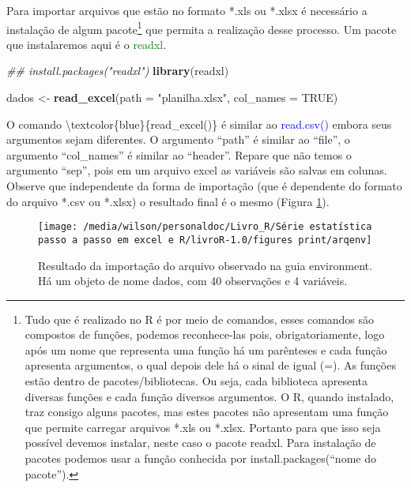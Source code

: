 \documentclass[14pt,titlepage, oneside, openany, a4paper]{book}
\newenvironment{Shaded}{\begin{snugshade}}{\end{snugshade}}
\newcommand{\CommentTok}[1]{\textcolor[rgb]{0.56,0.35,0.01}{\textit{#1}}}
\newcommand{\DataTypeTok}[1]{\textcolor[rgb]{0.13,0.29,0.53}{#1}}
\newcommand{\KeywordTok}[1]{\textcolor[rgb]{0.13,0.29,0.53}{\textbf{#1}}}
\newcommand{\NormalTok}[1]{#1}
\newcommand{\OtherTok}[1]{\textcolor[rgb]{0.56,0.35,0.01}{#1}}
\newcommand{\StringTok}[1]{\textcolor[rgb]{0.31,0.60,0.02}{#1}}
\begin{document}
Para importar arquivos que estão no formato *.xls ou *.xlsx é necessário a instalação de algum pacote\footnote{Tudo que é realizado no R é por meio de comandos, esses comandos são compostos de funções, podemos reconhece-las pois, obrigatoriamente, logo após um nome que representa uma função há um parênteses e cada função apresenta argumentos, o qual depois dele há o sinal de igual (=). As funções estão dentro de pacotes/bibliotecas. Ou seja, cada biblioteca apresenta diversas funções e cada função diversos argumentos. O R, quando instalado, traz consigo alguns pacotes, mas estes pacotes não apresentam uma função que permite carregar arquivos *.xls ou *.xlsx. Portanto para que isso seja possível devemos instalar, neste caso o pacote readxl. Para instalação de pacotes podemos usar a função conhecida por install.packages(``nome do pacote'').} que permita a realização desse processo. Um pacote que instalaremos aqui é o \textcolor{green}{readxl}.

\begin{Shaded}
\begin{Highlighting}[]
\CommentTok{## install.packages("readxl")}
\KeywordTok{library}\NormalTok{(readxl)}
\end{Highlighting}
\end{Shaded}

\begin{Shaded}
\begin{Highlighting}[]
\NormalTok{dados <-}\StringTok{ }\KeywordTok{read_excel}\NormalTok{(}\DataTypeTok{path =} \StringTok{"planilha.xlsx"}\NormalTok{, }\DataTypeTok{col_names =} \OtherTok{TRUE}\NormalTok{)}
\end{Highlighting}
\end{Shaded}

O comando \textbackslash{}textcolor\{blue\}\{read\_excel()\} é similar ao \textcolor{blue}{read.csv()} embora seus argumentos sejam diferentes. O argumento ``path'' é similar ao ``file'', o argumento ``col\_names'' é similar ao ``header''. Repare que não temos o argumento ``sep'', pois em um arquivo excel as variáveis são salvas em colunas. Observe que independente da forma de importação (que é dependente do formato do arquivo *.csv ou *.xlsx) o resultado final é o mesmo (Figura \ref{fig:arqenv}).

\begin{figure}[H]
\texttt{[image: /media/wilson/personaldoc/Livro\_R/Série estatística passo a passo em excel e R/livroR-1.0/figures print/arqenv]} \caption{Resultado da importação do arquivo observado na guia environment. Há um objeto de nome dados, com 40 observações e 4 variáveis.}\label{fig:arqenv}
\end{figure}
\end{document}
